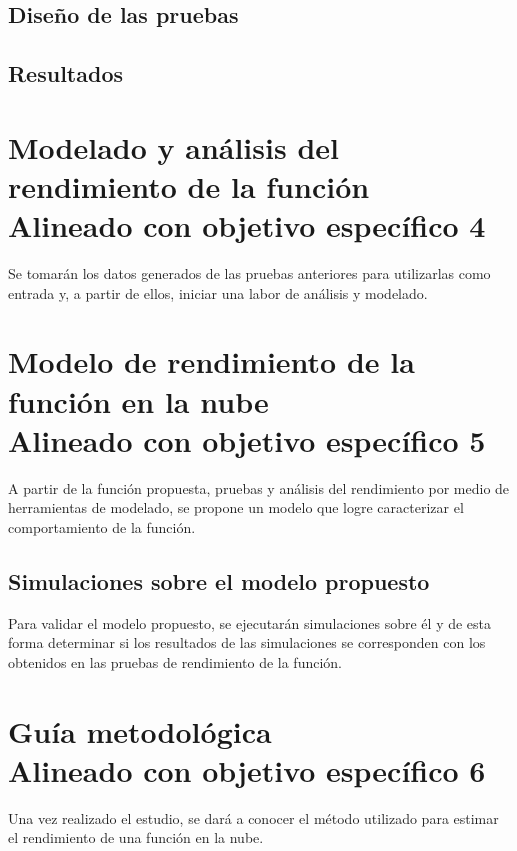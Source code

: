 \subsection{Diseño de las pruebas}

\subsection{Resultados}



\section[Modelado y análisis del rendimiento de la función]{Modelado y análisis del rendimiento de la función\\\small{Alineado con objetivo específico 4}}
Se tomarán los datos generados de las pruebas anteriores para utilizarlas como entrada y, a partir de ellos, iniciar una labor de análisis y modelado.

\section[Modelo de rendimiento de la función en la nube]{Modelo de rendimiento de la función en la nube\\\small{Alineado con objetivo específico 5}}
A partir de la función propuesta, pruebas y análisis del rendimiento por medio de herramientas de modelado, se propone un modelo que logre caracterizar el comportamiento de la función.

\subsection[Simulaciones sobre el modelo propuesto]{Simulaciones sobre el modelo propuesto}
Para validar el modelo propuesto, se ejecutarán simulaciones sobre él y de esta forma determinar si los resultados de las simulaciones se corresponden con los obtenidos en las pruebas de rendimiento de la función.

\section[Guía metodológica]{Guía metodológica\\\small{Alineado con objetivo específico 6}}
Una vez realizado el estudio, se dará a conocer el método utilizado para estimar el rendimiento de una función en la nube. 